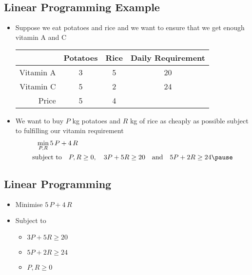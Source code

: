 \begin{slide}
\section{Linear Programming Example}

\begin{PauseHighLight}
  \begin{itemize}
  \item Suppose we eat potatoes and rice and we want to ensure that we
    get enough vitamin A and C\pause
    \begin{center}
      \begin{tabular}{|r|c|c|c|}\hline
     &Potatoes& Rice& Daily Requirement \\ \hline
        Vitamin A & 3 & 5 & 20 \\ \hline
        Vitamin C & 5 & 2 & 24 \\ \hline
        Price & 5 & 4 & \\ \hline
      \end{tabular}\pause
    \end{center}
  \item We want to buy $P$ kg potatoes and $R$ kg of rice as cheaply as
    possible subject to fulfilling our vitamin requirement\pause
    \begin{align*}
      \min_{P,R} 5\,P + 4\,R\hspace{8cm} \\
      \text{subject to} \quad P,R\geq0, \quad 3 P + 5 R \geq 20 \quad \text{and} \quad
      5 P + 2 R \geq 24\pause
    \end{align*}
  \end{itemize}
\end{PauseHighLight}

\end{slide}


\begin{slide}
\section{Linear Programming}

\pb
\begin{minipage}{0.4\linewidth}
    \begin{itemize}
    \item Minimise $5\,P + 4\,R$
    \item Subject to
      \begin{itemize}
      \item $3 P + 5 R \geq 20$
      \item $5 P + 2 R \geq 24$
      \item $P, R \geq 0$\pause
      \end{itemize}
    \end{itemize}
\end{minipage}\hfill
\begin{minipage}{0.55\linewidth}
  \pause
\end{minipage}
\end{slide}

